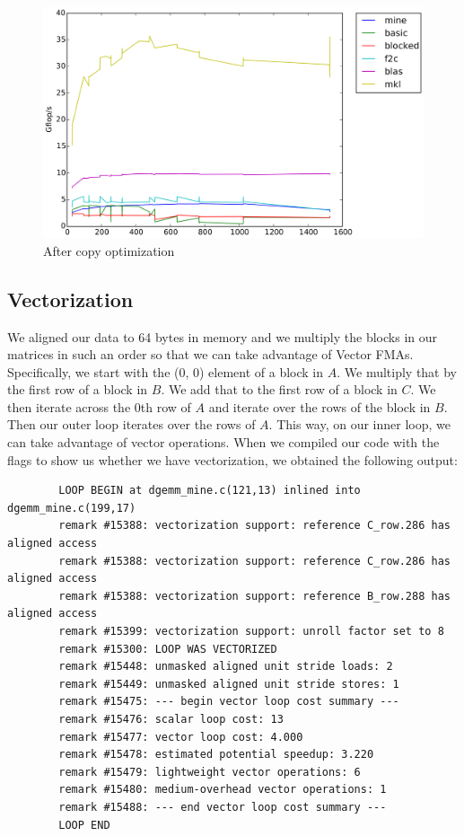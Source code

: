 \documentclass[11pt]{article}
\begin{document}
   		\begin{figure}[H]
   			\centering
   			\includegraphics[width=4.5in]{timing_32_cp.png}
   			\caption{After copy optimization}
   		\end{figure}
   		
   		\clearpage
     		
    
                
        \subsection{Vectorization}
        We aligned our data to 64 bytes in memory and we multiply the blocks in our matrices in such an order so that we can take advantage of Vector FMAs. Specifically, we start with the (0, 0) element of a block in $A$. We multiply that by the first row of a block in $B$. We add that to the first row of a block in $C$. We then iterate across the 0th row of $A$ and iterate over the rows of the block in $B$. Then our outer loop iterates over the rows of $A$. This way, on our inner loop, we can take advantage of vector operations. When we compiled our code with the flags to show us whether we have vectorization, we obtained the following output:
        
        \vspace{1cm}
        
        \begin{lstlisting}
        LOOP BEGIN at dgemm_mine.c(121,13) inlined into dgemm_mine.c(199,17)
        remark #15388: vectorization support: reference C_row.286 has aligned access
        remark #15388: vectorization support: reference C_row.286 has aligned access
        remark #15388: vectorization support: reference B_row.288 has aligned access
        remark #15399: vectorization support: unroll factor set to 8
        remark #15300: LOOP WAS VECTORIZED
        remark #15448: unmasked aligned unit stride loads: 2 
        remark #15449: unmasked aligned unit stride stores: 1 
        remark #15475: --- begin vector loop cost summary ---
        remark #15476: scalar loop cost: 13 
        remark #15477: vector loop cost: 4.000 
        remark #15478: estimated potential speedup: 3.220 
        remark #15479: lightweight vector operations: 6 
        remark #15480: medium-overhead vector operations: 1 
        remark #15488: --- end vector loop cost summary ---
        LOOP END
        \end{lstlisting}
        
\end{document}
